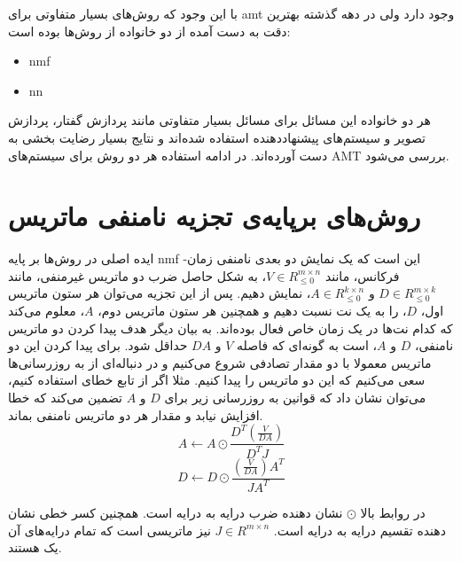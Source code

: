 با این وجود که روش‌های بسیار متفاوتی برای \gls{amt} وجود دارد ولی در دهه گذشته
بهترین دقت به دست آمده از دو خانواده از روش‌ها بوده است:
\begin{itemize}
    \item \gls{nmf}
    \item \gls{nn}
\end{itemize}
هر دو خانواده این مسائل برای مسائل بسیار متفاوتی مانند پردازش گفتار، پردازش
تصویر و سیستم‌های پیشنهاددهنده استفاده شده‌اند و نتایج بسیار رضایت بخشی به دست
آورده‌اند. در ادامه استفاده هر دو روش برای سیستم‌های \gls{AMT} بررسی می‌شود.

\section{روش‌های برپایه‌ی تجزیه نامنفی ماتریس}
ایده اصلی در روش‌ها بر پایه \gls{nmf} این است که یک نمایش دو بعدی نامنفی
زمان-فرکانس، مانند $V \in R_{\leq 0}^{m \times n}$، به شکل حاصل ضرب دو ماتریس
غیرمنفی، مانند $D \in R_{\leq 0}^{m \times k}$ و $A \in R_{\leq 0}^{k \times
n}$، نمایش دهیم. پس از این تجزیه می‌توان هر ستون ماتریس اول، $D$، را به یک نت
نسبت دهیم و همچنین هر ستون ماتریس دوم، $A$، معلوم می‌کند که کدام نت‌ها در یک
زمان خاص فعال بوده‌اند. به بیان دیگر هدف پیدا کردن دو ماتریس نامنفی، $D$ و $A$،
است به گونه‌ای که فاصله $V$ و $DA$ حداقل شود. برای پیدا کردن این دو ماتریس
معمولا با دو مقدار تصادفی شروع می‌کنیم و در دنباله‌ای از به روزرسانی‌ها سعی
می‌کنیم که این دو ماتریس را پیدا کنیم. مثلا اگر از تابع خطای
 استفاده کنیم، می‌توان نشان داد که قوانین به روزرسانی زیر
برای $D$ و $A$ تضمین می‌کند که خطا افزایش نیابد و مقدار هر دو ماتریس نامنفی
بماند.
\begin{equation}
    A \leftarrow A \odot \frac{D^T(\frac{V}{DA})}{D^T J}
\end{equation}
\begin{equation}
    D \leftarrow D \odot \frac{(\frac{V}{DA})A^T}{J A^T}
\end{equation}

در روابط بالا $\odot$ نشان دهنده ضرب درایه به درایه است. همچنین کسر خطی نشان
دهنده تقسیم درایه به درایه است. $J \in R^{m \times n}$ نیز ماتریسی است که تمام
درایه‌های آن یک هستند.

